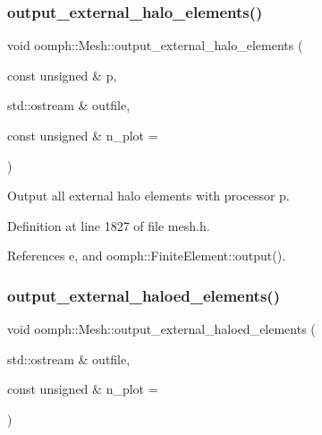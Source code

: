 \subsubsection{\texorpdfstring{output\+\_\+external\+\_\+halo\+\_\+elements()}{output\_external\_halo\_elements()}\hspace{0.1cm}{\footnotesize\ttfamily [2/2]}}
{\footnotesize\ttfamily void oomph\+::\+Mesh\+::output\+\_\+external\+\_\+halo\+\_\+elements (\begin{DoxyParamCaption}\item[{const unsigned \&}]{p,  }\item[{std\+::ostream \&}]{outfile,  }\item[{const unsigned \&}]{n\+\_\+plot = {} }\end{DoxyParamCaption})\hspace{0.3cm}{\ttfamily [inline]}}



Output all external halo elements with processor p. 



Definition at line 1827 of file mesh.\+h.



References e, and oomph\+::\+Finite\+Element\+::output().

\mbox{\label{classoomph_1_1Mesh_a9b165e729938cf8d11e348969ea40a25}} 
\subsubsection{\texorpdfstring{output\+\_\+external\+\_\+haloed\+\_\+elements()}{output\_external\_haloed\_elements()}\hspace{0.1cm}{\footnotesize\ttfamily [1/2]}}
{\footnotesize\ttfamily void oomph\+::\+Mesh\+::output\+\_\+external\+\_\+haloed\+\_\+elements (\begin{DoxyParamCaption}\item[{std\+::ostream \&}]{outfile,  }\item[{const unsigned \&}]{n\+\_\+plot = {} }\end{DoxyParamCaption})\hspace{0.3cm}{\ttfamily [inline]}}



